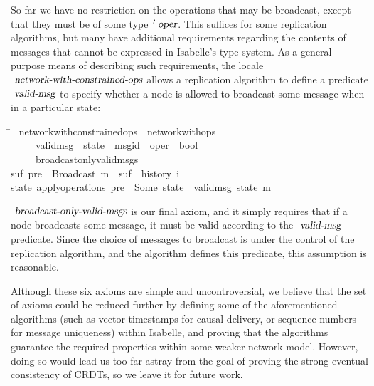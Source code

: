 So far we have no restriction on the operations that may be broadcast, except that they must be of some type $\isacharprime\isa{oper}$.
This suffices for some replication algorithms, but many have additional requirements regarding the contents of messages that cannot be expressed in Isabelle's type system.
As a general-purpose means of describing such requirements, the locale $\isa{network-with-constrained-ops}$ allows a replication algorithm to define a predicate $\isa{valid-msg}$ to specify whether a node is allowed to broadcast some message when in a particular state:
\begin{isabelle}
\hspace{6em}\=\kill
{}\ network{\isacharunderscore}with{\isacharunderscore}constrained{\isacharunderscore}ops\ {\isacharequal}\ network{\isacharunderscore}with{\isacharunderscore}ops\ {\isacharplus}\\
~~~~\ valid{\isacharunderscore}msg\ {\isacharcolon}{\isacharcolon}\ {\isachardoublequoteopen}{\isacharprime}state\ {\isasymRightarrow}\ {\isacharparenleft}{\isacharprime}msgid\ {\isasymtimes}\ {\isacharprime}oper{\isacharparenright}\ {\isasymRightarrow}\ bool{\isachardoublequoteclose}\\
~~~~\ broadcast{\isacharunderscore}only{\isacharunderscore}valid{\isacharunderscore}msgs{\isacharcolon}\\
\>{\isachardoublequoteopen}{\isasymexists}suf{\isachardot}\ pre\ {\isacharat}\ {\isacharbrackleft}Broadcast\ m{\isacharbrackright}\ {\isacharat}\ suf\ {\isacharequal}\ history\ i\ {\isasymLongrightarrow}\\
\>{\isasymexists}state{\isachardot}\ apply{\isacharunderscore}operations\ pre\ {\isacharequal}\ Some\ state\ {\isasymand}\ valid{\isacharunderscore}msg\ state\ m{\isachardoublequoteclose}
\end{isabelle}

$\isa{broadcast-only-valid-msgs}$ is our final axiom, and it simply requires that if a node broadcasts some message, it must be valid according to the $\isa{valid-msg}$ predicate.
Since the choice of messages to broadcast is under the control of the replication algorithm, and the algorithm defines this predicate, this assumption is reasonable.

Although these six axioms are simple and uncontroversial, we believe that the set of axioms could be reduced further by defining some of the aforementioned algorithms (such as vector timestamps for causal delivery, or sequence numbers for message uniqueness) within Isabelle, and proving that the algorithms guarantee the required properties within some weaker network model.
However, doing so would lead us too far astray from the goal of proving the strong eventual consistency of CRDTs, so we leave it for future work.

